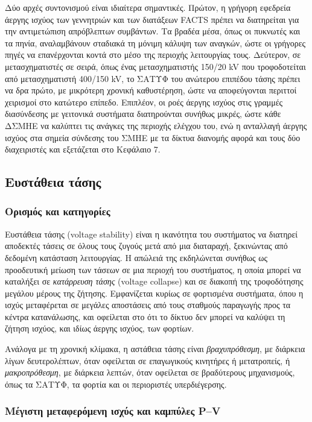 Δύο αρχές συντονισμού είναι ιδιαίτερα σημαντικές. Πρώτον, η γρήγορη εφεδρεία άεργης ισχύος των
γεννητριών και των διατάξεων FACTS πρέπει να διατηρείται για την αντιμετώπιση απρόβλεπτων
συμβάντων. Τα βραδέα μέσα, όπως οι πυκνωτές και τα πηνία, αναλαμβάνουν σταδιακά τη μόνιμη
κάλυψη των αναγκών, ώστε οι γρήγορες πηγές να επανέρχονται κοντά στο μέσο της περιοχής
λειτουργίας τους. Δεύτερον, σε μετασχηματιστές σε σειρά, όπως ένας μετασχηματιστής 150/20 kV
που τροφοδοτείται από μετασχηματιστή 400/150 kV, το ΣΑΤΥΦ του ανώτερου επιπέδου τάσης πρέπει
να δρα πρώτο, με μικρότερη χρονική καθυστέρηση, ώστε να αποφεύγονται περιττοί χειρισμοί στο
κατώτερο επίπεδο. Επιπλέον, οι ροές άεργης ισχύος στις γραμμές διασύνδεσης με γειτονικά
συστήματα διατηρούνται συνήθως μικρές, ώστε κάθε ΔΣΜΗΕ να καλύπτει τις ανάγκες της περιοχής
ελέγχου του, ενώ η ανταλλαγή άεργης ισχύος στα σημεία σύνδεσης του ΣΜΗΕ με τα
δίκτυα διανομής αφορά και τους δύο διαχειριστές και εξετάζεται στο Κεφάλαιο 7.

\subsection{Ευστάθεια τάσης}
\label{sec:v-stability}

\subsubsection{Ορισμός και κατηγορίες}

Ευστάθεια τάσης (voltage stability) είναι η ικανότητα του συστήματος να διατηρεί αποδεκτές
τάσεις σε όλους τους ζυγούς μετά από μια διαταραχή, ξεκινώντας από δεδομένη κατάσταση
λειτουργίας. Η απώλειά της εκδηλώνεται συνήθως ως προοδευτική μείωση των τάσεων σε μια περιοχή
του συστήματος, η οποία μπορεί να καταλήξει σε \emph{κατάρρευση τάσης} (voltage collapse) και
σε διακοπή της τροφοδότησης μεγάλου μέρους της ζήτησης. Εμφανίζεται κυρίως σε φορτισμένα
συστήματα, όπου η ισχύς μεταφέρεται σε μεγάλες αποστάσεις από τους σταθμούς παραγωγής προς τα
κέντρα κατανάλωσης, και οφείλεται στο ότι το δίκτυο δεν μπορεί να καλύψει τη ζήτηση ισχύος, και
ιδίως άεργης ισχύος, των φορτίων.

Ανάλογα με τη χρονική κλίμακα, η αστάθεια τάσης είναι \emph{βραχυπρόθεσμη}, με διάρκεια λίγων
δευτερολέπτων, όταν οφείλεται σε επαγωγικούς κινητήρες ή μετατροπείς, ή \emph{μακροπρόθεσμη}, με
διάρκεια λεπτών, όταν οφείλεται σε βραδύτερους μηχανισμούς, όπως τα ΣΑΤΥΦ, τα φορτία και οι περιοριστές υπερδιέγερσης.

\subsubsection{Μέγιστη μεταφερόμενη ισχύς και καμπύλες P--V}

